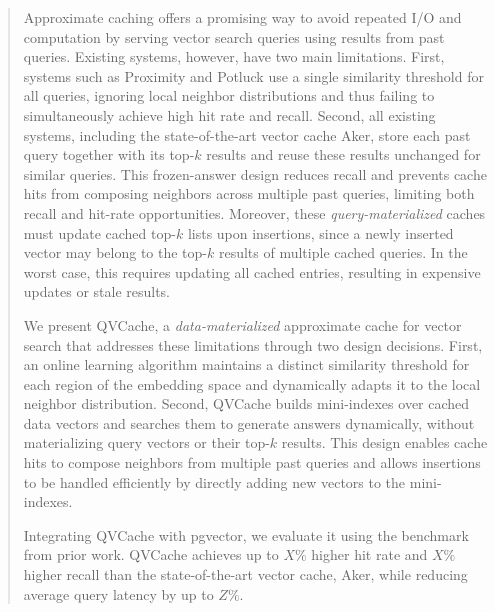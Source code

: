  \begin{abstract}
Approximate caching offers a promising way to avoid repeated I/O and computation by serving vector search queries using results from past queries. Existing systems, however, have two main limitations. First, systems such as Proximity and Potluck use a single similarity threshold for all queries, ignoring local neighbor distributions and thus failing to simultaneously achieve high hit rate and recall. Second, all existing systems, including the state-of-the-art vector cache Aker, store each past query together with its top-$k$ results and reuse these results unchanged for similar queries. This frozen-answer design reduces recall and prevents cache hits from composing neighbors across multiple past queries, limiting both recall and hit-rate opportunities. Moreover, these \emph{query-materialized} caches must update cached top-$k$ lists upon insertions, since a newly inserted vector may belong to the top-$k$ results of multiple cached queries. In the worst case, this requires updating all cached entries, resulting in expensive updates or stale results.

We present QVCache, a \emph{data-materialized} approximate cache for vector search that addresses these limitations through two design decisions. First, an online learning algorithm maintains a distinct similarity threshold for each region of the embedding space and dynamically adapts it to the local neighbor distribution. Second, QVCache builds mini-indexes over cached data vectors and searches them to generate answers dynamically, without materializing query vectors or their top-$k$ results. This design enables cache hits to compose neighbors from multiple past queries and allows insertions to be handled efficiently by directly adding new vectors to the mini-indexes.

Integrating QVCache with pgvector, we evaluate it using the benchmark from prior work. QVCache achieves up to $X\%$ higher hit rate and $X\%$ higher recall than the state-of-the-art vector cache, Aker, while reducing average query latency by up to $Z\%$.

\end{abstract}

